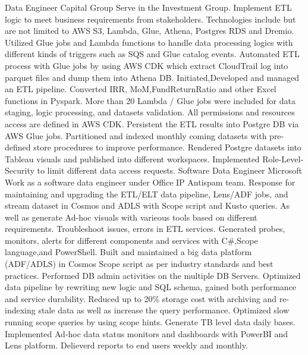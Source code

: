 \documentclass[a4paper]{ReadableCV}
\begin{document}
{}
{Data Engineer}
{Capital Group}
{Serve in the Investment Group. Implement ETL logic to meet business requirements from stakeholders. Technologies include but are not limited to AWS S3, Lambda, Glue, Athena, Postgres RDS and Dremio.}
{Utilized Glue jobs and Lambda functions to handle data processing logics with different kinds of triggers such as SQS and Glue catalog events.}
{Automated ETL process with Glue jobs by using AWS CDK which extract CloudTrail log into parquet files and dump them into Athena DB.}
{Initiated,Developed and managed an ETL pipeline. Converted IRR, MoM,FundReturnRatio and other Excel functions in Pyspark. More than 20 Lambda / Glue jobs were included for data staging, logic processing, and datasets validation. All permissions and resources access are defined in AWS CDK.}
{Persistent the ETL results into Postgre DB via AWS Glue jobs. Partitioned and indexed monthly coming datasets with pre-defined store procedures to improve performance.}
{Rendered Postgre datasets into Tableau visuals and published into different workspaces. Implemented Role-Level-Security to limit different data access requests.}
{Software Data Engineer}
{Microsoft}
{Work as a software data engineer under Office IP Antispam team. Response for maintaining and upgrading the ETL/ELT data pipeline, Lens/ADF jobs, and stream dataset in
	Cosmos and ADLS with Scope script and Kusto queries. As well as generate Ad-hoc visuals with varieous tools based on different requirements. }
{Troubleshoot issues, errors in ETL services. Generated probes, monitors, alerts for different components and services with C\#,Scope language,and PowerShell.}
{Built and maintained a big data platform (ADF/ADLS) in Cosmos Scope script as per industry standards and best practices.}
{Performed DB admin activities on the multiple DB Servers. Optimized data pipeline by rewriting new logic and SQL schema, gained both performance and service durability. Reduced up to 20\% storage cost with archiving and re-indexing stale data as well as increase the query performance.}
{Optimized slow running scope queries by using scope hints. Generate TB level data daily bases.}
{Implemented Ad-hoc data status monitors and dashboards with PowerBI and Lens platform. Delieverd reports to end users weekly and monthly.}
\end{document}
